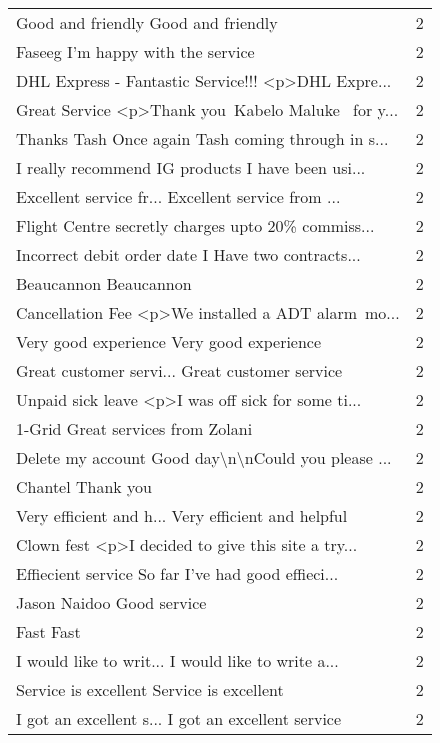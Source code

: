 \begin{tabular}{lr}
Good and friendly Good and friendly                &        2 \\
Faseeg I’m happy with the service                  &        2 \\
DHL Express - Fantastic Service!!! <p>DHL Expre... &        2 \\
Great Service <p>Thank you Kabelo Maluke  for y... &        2 \\
Thanks Tash Once again Tash coming through in s... &        2 \\
I really recommend IG products  I have been usi... &        2 \\
Excellent service fr... Excellent service from ... &        2 \\
Flight Centre secretly charges upto 20\% commiss... &        2 \\
Incorrect debit order date I Have two contracts... &        2 \\
Beaucannon Beaucannon                              &        2 \\
Cancellation Fee <p>We installed a ADT alarm mo... &        2 \\
Very good experience Very good experience          &        2 \\
Great customer servi... Great customer service     &        2 \\
Unpaid sick leave <p>I was off sick for some ti... &        2 \\
1-Grid Great services from Zolani                  &        2 \\
Delete my account Good day\textbackslash n\textbackslash nCould you please ... &        2 \\
Chantel Thank you                                  &        2 \\
Very efficient and h... Very efficient and helpful &        2 \\
Clown fest <p>I decided to give this site a try... &        2 \\
Effiecient service So far I've had good effieci... &        2 \\
Jason Naidoo Good service                          &        2 \\
Fast Fast                                          &        2 \\
I would like to writ... I would like to write a... &        2 \\
Service is excellent Service is excellent          &        2 \\
I got an excellent s... I got an excellent service &        2 \\

\end{tabular}
